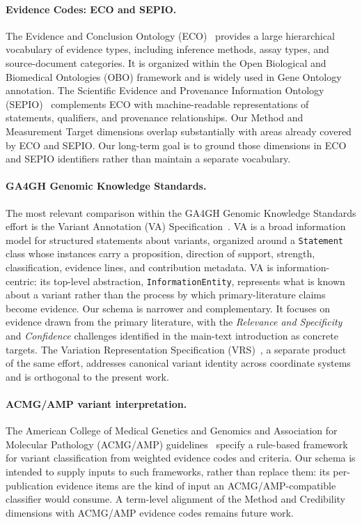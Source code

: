 \paragraph{Evidence Codes: ECO and SEPIO.}
The Evidence and Conclusion Ontology (ECO)~\cite{eco2019} provides a large
hierarchical vocabulary of evidence types, including inference methods, assay
types, and source-document categories. It is organized within the Open
Biological and Biomedical Ontologies (OBO) framework and is widely used in
Gene Ontology annotation. The Scientific Evidence and Provenance Information
Ontology (SEPIO)~\cite{sepio} complements ECO with machine-readable
representations of statements, qualifiers, and provenance relationships. Our
Method and Measurement Target dimensions overlap substantially with areas
already covered by ECO and SEPIO. Our long-term goal is to ground those
dimensions in ECO and SEPIO identifiers rather than maintain a separate
vocabulary.

\paragraph{GA4GH Genomic Knowledge Standards.}
The most relevant comparison within the GA4GH Genomic Knowledge Standards
effort is the Variant Annotation (VA) Specification~\cite{ga4gh_va}. VA is a
broad information model for structured statements about variants, organized
around a \texttt{Statement} class whose instances carry a proposition,
direction of support, strength, classification, evidence lines, and
contribution metadata. VA is information-centric: its top-level abstraction,
\texttt{InformationEntity}, represents what is known about a variant rather
than the process by which primary-literature claims become evidence. Our
schema is narrower and complementary. It focuses on evidence drawn from the
primary literature, with the \emph{Relevance and Specificity} and
\emph{Confidence} challenges identified in the main-text introduction as
concrete targets. The Variation Representation Specification
(VRS)~\cite{ga4gh_vrs}, a separate product of the same effort, addresses
canonical variant identity across coordinate systems and is orthogonal to the
present work.

\paragraph{ACMG/AMP variant interpretation.}
The American College of Medical Genetics and Genomics and Association for
Molecular Pathology (ACMG/AMP) guidelines~\cite{acmg2015} specify a
rule-based framework for variant classification from weighted evidence codes
and criteria. Our schema is intended to supply inputs to such frameworks,
rather than replace them: its per-publication evidence items are the kind of
input an ACMG/AMP-compatible classifier would consume. A term-level alignment
of the Method and Credibility dimensions with ACMG/AMP evidence codes remains
future work.

